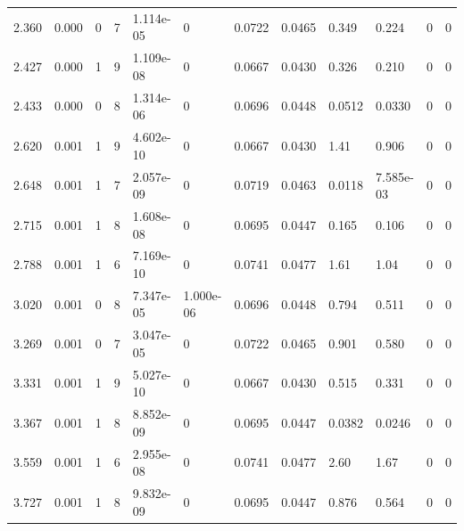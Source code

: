 \documentclass[preview]{standalone}
\begin{document}
{{\begin{tabular}{L{1.2cm}C{1.2cm} C{0.3cm}C{0.5cm} C{1.4cm}C{1.4cm} C{1.4cm}C{1.4cm} C{1.6cm}C{1.6cm} C{1.6cm}C{1.6cm}}
  2.360  &  0.000  & 0     &  7 &  1.114e-05  & 0  &  0.0722&   0.0465& 0.349 & 0.224   &  0 & 0  \\ 
  2.427  &  0.000  & 1     &  9 &  1.109e-08  & 0  &  0.0667&   0.0430& 0.326 & 0.210   &  0 & 0  \\ 
  2.433  &  0.000  & 0     &  8 &  1.314e-06  & 0  &  0.0696&   0.0448& 0.0512 & 0.0330   &  0 & 0  \\ 
  2.620  &  0.001  & 1     &  9 &  4.602e-10  & 0  &  0.0667&   0.0430& 1.41 & 0.906   &  0 & 0  \\ 
  2.648  &  0.001  & 1     &  7 &  2.057e-09  & 0  &  0.0719&   0.0463& 0.0118 & 7.585e-03   &  0 & 0  \\ 
  2.715  &  0.001  & 1     &  8 &  1.608e-08  & 0  &  0.0695&   0.0447& 0.165 & 0.106   &  0 & 0  \\ 
  2.788  &  0.001  & 1     &  6 &  7.169e-10  & 0  &  0.0741&   0.0477& 1.61 & 1.04   &  0 & 0  \\ 
  3.020  &  0.001  & 0     &  8 &  7.347e-05  & 1.000e-06  &  0.0696&   0.0448& 0.794 & 0.511   &  0 & 0  \\ 
  3.269  &  0.001  & 0     &  7 &  3.047e-05  & 0  &  0.0722&   0.0465& 0.901 & 0.580   &  0 & 0  \\ 
  3.331  &  0.001  & 1     &  9 &  5.027e-10  & 0  &  0.0667&   0.0430& 0.515 & 0.331   &  0 & 0  \\ 
  3.367  &  0.001  & 1     &  8 &  8.852e-09  & 0  &  0.0695&   0.0447& 0.0382 & 0.0246   &  0 & 0  \\ 
  3.559  &  0.001  & 1     &  6 &  2.955e-08  & 0  &  0.0741&   0.0477& 2.60 & 1.67   &  0 & 0  \\ 
  3.727  &  0.001  & 1     &  8 &  9.832e-09  & 0  &  0.0695&   0.0447& 0.876 & 0.564   &  0 & 0  \\ 
\hline 
\end{tabular} 

}}
\end{document}
